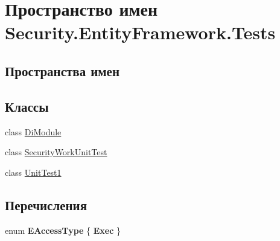 \hypertarget{namespace_security_1_1_entity_framework_1_1_tests}{}\section{Пространство имен Security.\+Entity\+Framework.\+Tests}
\label{namespace_security_1_1_entity_framework_1_1_tests}
\subsection*{Пространства имен}
\begin{DoxyCompactItemize}
\end{DoxyCompactItemize}
\subsection*{Классы}
\begin{DoxyCompactItemize}
\item 
class \hyperlink{class_security_1_1_entity_framework_1_1_tests_1_1_di_module}{Di\+Module}
\item 
class \hyperlink{class_security_1_1_entity_framework_1_1_tests_1_1_security_work_unit_test}{Security\+Work\+Unit\+Test}
\item 
class \hyperlink{class_security_1_1_entity_framework_1_1_tests_1_1_unit_test1}{Unit\+Test1}
\end{DoxyCompactItemize}
\subsection*{Перечисления}
\begin{DoxyCompactItemize}
\item 
\mbox{\label{namespace_security_1_1_entity_framework_1_1_tests_a487ab3e819ffde9f58982b2891edb7d7}} 
enum {\bfseries E\+Access\+Type} \{ {\bfseries Exec}
 \}
\end{DoxyCompactItemize}
